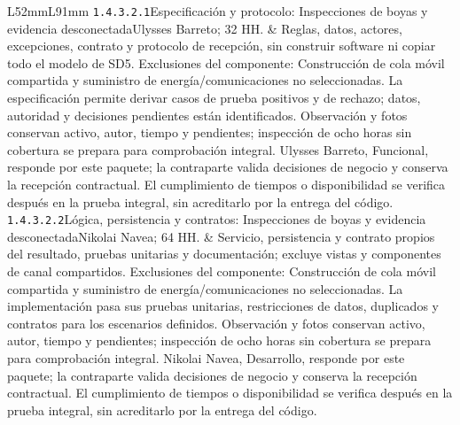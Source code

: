 \begin{longtable}{L{52mm}L{91mm}}
\texttt{1.\allowbreak{}4.\allowbreak{}3.\allowbreak{}2.\allowbreak{}1}\newline Especificación y protocolo: Inspecciones de boyas y evidencia desconectada\newline Ulysses Barreto; 32 HH. & Reglas, datos, actores, excepciones, contrato y protocolo de recepción, sin construir software ni copiar todo el modelo de SD5. Exclusiones del componente: Construcción de cola móvil compartida y suministro de energía/comunicaciones no seleccionadas. La especificación permite derivar casos de prueba positivos y de rechazo; datos, autoridad y decisiones pendientes están identificados. Observación y fotos conservan activo, autor, tiempo y pendientes; inspección de ocho horas sin cobertura se prepara para comprobación integral. Ulysses Barreto, Funcional, responde por este paquete; la contraparte valida decisiones de negocio y conserva la recepción contractual. El cumplimiento de tiempos o disponibilidad se verifica después en la prueba integral, sin acreditarlo por la entrega del código.\\\hline
\texttt{1.\allowbreak{}4.\allowbreak{}3.\allowbreak{}2.\allowbreak{}2}\newline Lógica, persistencia y contratos: Inspecciones de boyas y evidencia desconectada\newline Nikolai Navea; 64 HH. & Servicio, persistencia y contrato propios del resultado, pruebas unitarias y documentación; excluye vistas y componentes de canal compartidos. Exclusiones del componente: Construcción de cola móvil compartida y suministro de energía/comunicaciones no seleccionadas. La implementación pasa sus pruebas unitarias, restricciones de datos, duplicados y contratos para los escenarios definidos. Observación y fotos conservan activo, autor, tiempo y pendientes; inspección de ocho horas sin cobertura se prepara para comprobación integral. Nikolai Navea, Desarrollo, responde por este paquete; la contraparte valida decisiones de negocio y conserva la recepción contractual. El cumplimiento de tiempos o disponibilidad se verifica después en la prueba integral, sin acreditarlo por la entrega del código.\\\hline

\end{longtable}
